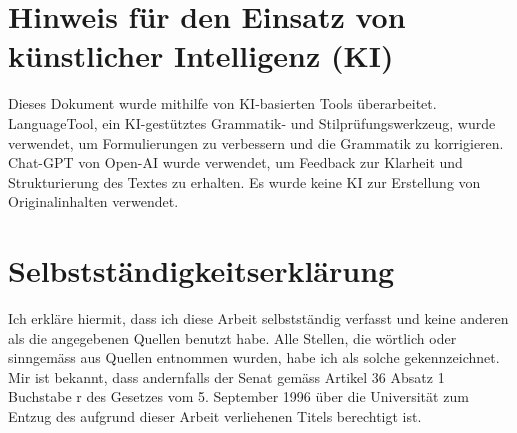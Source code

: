 \documentclass{template}
\begin{document}
\clearpage



\clearpage



\clearpage



\clearpage



\clearpage



\clearpage



\clearpage
\printglossary


\clearpage
{}
\printbibliography[heading=bibintoc]

\clearpage

\section*{Hinweis für den Einsatz von künstlicher Intelligenz (KI)}

Dieses Dokument wurde mithilfe von KI-basierten Tools überarbeitet. LanguageTool, ein KI-gestütztes Grammatik- und Stilprüfungswerkzeug, wurde verwendet, um Formulierungen zu verbessern und die Grammatik zu korrigieren. Chat-GPT von Open-AI wurde verwendet, um Feedback zur Klarheit und Strukturierung des Textes zu erhalten. Es wurde keine KI zur Erstellung von Originalinhalten verwendet.


\clearpage

\section*{Selbstständigkeitserklärung}

Ich erkläre hiermit, dass ich diese Arbeit selbstständig verfasst und keine anderen als die angegebenen Quellen benutzt habe. Alle Stellen, die wörtlich oder sinngemäss aus Quellen entnommen wurden, habe ich als solche gekennzeichnet. Mir ist bekannt, dass andernfalls der Senat gemäss Artikel 36 Absatz 1 Buchstabe r des Gesetzes vom 5. September 1996 über die Universität zum Entzug des aufgrund dieser Arbeit verliehenen Titels berechtigt ist.
\end{document}
